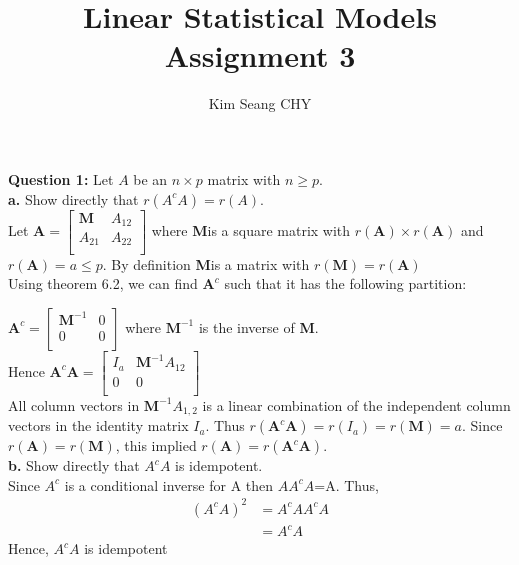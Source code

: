 \documentclass[12 pt, a4paper]{article}
\title{Linear Statistical Models Assignment 3}
\date{}
\author{Kim Seang CHY}
\newcommand{\A}{\textbf{A}}
\newcommand{\M}{\textbf{M}}
\begin{document}
\maketitle


\noindent \textbf{Question 1:}	Let $A$ be an $n \times p$ matrix with $n \geq p$.\\

\noindent \textbf{a.} Show directly that $r(A^c A) = r(A)$.\\

\noindent Let $\A=
\left[
\begin{array}{c|c}
\M & A_{12}\\
\hline
A_{21}& A_{22}\\
\end{array}
\right] $  where \M \space is a square matrix with $r(\A) \times r(\A)$ and $r(\A)=a\leq p$. By definition \M \space is a matrix with $r(\M)=r(\A)$\\

\noindent Using theorem 6.2, we can find $\A^c$ such that it has the following partition:

\noindent $\A^c=
\left[
\begin{array}{c|c}
\M^{-1} & 0\\
\hline
0 & 0\\
\end{array}
\right] $ where $\M^{-1}$ is the inverse of \M.\\

\vspace{0.5cm}
\noindent Hence $\A^c\A=
\left[
\begin{array}{c|c}
I_a & \M^{-1}A_{12} \\
\hline
0 & 0\\
\end{array}
\right] $ \\

		

\noindent All column vectors in $\M^{-1}A_{1,2}$ is a linear combination of the independent column vectors  in the identity matrix $I_a$.    Thus $r(\A^c\A)=r(I_a)=r(\M)=a$. Since $r(\A)=r(\M)$, this implied $r(\A)= r(\A^c\A)$.\\




\noindent \textbf{b.} Show directly that $A^c A$ is idempotent.\\

\noindent Since $A^c$ is a conditional inverse for A then $AA^cA$=A. Thus,
\begin{align*}
\left(A^cA\right)^2&=A^cA A^cA \\
&= A^cA
\end{align*}		
 \noindent Hence, $A^cA$ is idempotent\\
		
\end{document}
